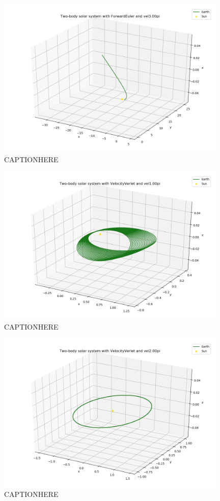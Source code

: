 \documentclass{article}
\begin{document}
    \begin{figure}[H]
        \centering
        \includegraphics[width = 11cm]{img/plot3D_S_E_F_vel300pi.png}
        \caption{CAPTIONHERE}
        \label{fig:plot3D_S_E_F_vel300pi}
    \end{figure}

    \begin{figure}[H]
        \centering
        \includegraphics[width = 11cm]{img/plot3D_S_E_V_vel100pi.png}
        \caption{CAPTIONHERE}
        \label{fig:plot3D_S_E_V_vel100pi}
    \end{figure}

    \begin{figure}[H]
        \centering
        \includegraphics[width = 11cm]{img/plot3D_S_E_V_vel200pi.png}
        \caption{CAPTIONHERE}
        \label{fig:plot3D_S_E_V_vel200pi}
    \end{figure}
\end{document}
